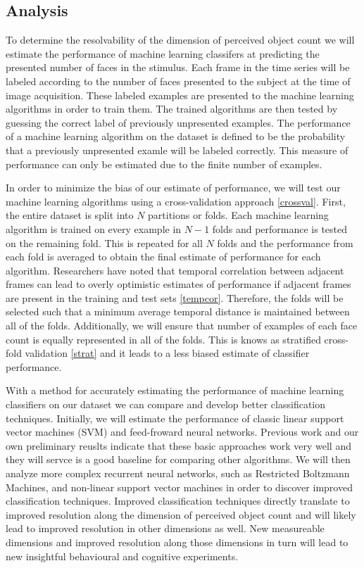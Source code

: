 \documentclass[12pt]{article}
\begin{document}
\subsection{Analysis}
To determine the resolvability of the dimension of perceived object count we will estimate the performance of machine learning classifers at predicting the presented number of faces in the stimulus.
Each frame in the time series will be labeled according to the number of faces presented to the subject at the time of image acquisition.
These labeled examples are presented to the machine learning algorithms in order to train them.
The trained algorithms are then tested by guessing the correct label of previously unpresented examples.
The performance of a machine learning algorithm on the dataset is defined to be the probability that a previously unpresented examle will be labeled correctly.
This measure of performance can only be estimated due to the finite number of examples.

In order to minimize the bias of our estimate of performance, we will test our machine learning algorithms using a cross-validation approach \ref{crossval}.
First, the entire dataset is split into $N$ partitions or folds.
Each machine learning algorithm is trained on every example in $N-1$ folds and performance is tested on the remaining fold.
This is repeated for all $N$ folds and the performance from each fold is averaged to obtain the final estimate of performance for each algorithm.
Researchers have noted that temporal correlation between adjacent frames can lead to overly optimistic estimates of performance if adjacent frames are present in the training and test sets \ref{tempcor}.
Therefore, the folds will be selected such that a minimum average temporal distance is maintained between all of the folds.
Additionally, we will ensure that number of examples of each face count is equally represented in all of the folds.
This is knows as stratified cross-fold validation \ref{strat} and it leads to a less biased estimate of classifier performance.

With a method for accurately estimating the performance of machine learning classifiers on our dataset we can compare and develop better classification techniques.
Initially, we will estimate the performance of classic linear support vector machines (SVM) and feed-froward neural networks.
Previous work and our own preliminary reuslts indicate that these basic approaches work very well and they will servce is a good baseline for comparing other algorithms.
We will then analyze more complex recurrent neural networks, such as Restricted Boltzmann Machines, and non-linear support vector machines in order to discover improved classification techniques.
Improved classification techniques directly translate to improved resolution along the dimension of perceived object count and will likely lead to improved resolution in other dimensions as well.
New measureable dimensions and improved resolution along those dimensions in turn will lead to new insightful behavioural and cognitive experiments.


\end{document}
